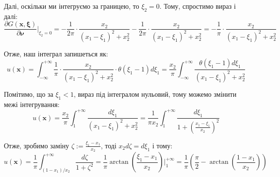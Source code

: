 \documentclass{hw_template}
\begin{document}
Далі, оскільки ми інтегруємо за границею, то $\xi_2 = 0$. Тому, спростимо вираз і далі:
\begin{equation*}
    \frac{\partial G(\mathbf{x}, \boldsymbol{\xi})}{\partial \boldsymbol{\nu}}\Big|_{\xi_2=0} = -\frac{1}{2\pi} \cdot \frac{x_2}{(x_1-\xi_1)^2+x_2^2} - \frac{1}{2\pi} \cdot \frac{x_2}{(x_1-\xi_1)^2+x_2^2} = -\frac{1}{\pi} \cdot \frac{x_2}{(x_1-\xi_1)^2+x_2^2}
\end{equation*}

Отже, наш інтеграл запишеться як:
\begin{equation*}
    u(\mathbf{x}) = \int_{-\infty}^{+\infty} \frac{1}{\pi} \cdot \frac{x_2}{(x_1-\xi_1)^2+x_2^2} \cdot \theta(\xi_1-1)d\xi_1 = \frac{x_2}{\pi}\int_{-\infty}^{+\infty} \frac{\theta(\xi_1-1)d\xi_1}{(x_1-\xi_1)^2+x_2^2}
\end{equation*}

Помітимо, що за $\xi_1 < 1$, вираз під інтегралом нульовий, тому можемо змінити межі інтегрування:
\begin{equation*}
    u(\mathbf{x}) = \frac{x_2}{\pi}\int_{1}^{+\infty} \frac{d\xi_1}{(x_1-\xi_1)^2+x_2^2} = \frac{1}{\pi x_2}\int_1^{+\infty} \frac{d\xi_1}{1+\left(\frac{x_1-\xi_1}{x_2}\right)^2}
\end{equation*}

Отже, зробимо заміну $\zeta := \frac{\xi_1-x_1}{x_2}$, тоді $x_2d\zeta = d\xi_1$ і тому:
\begin{equation*}
    u(\mathbf{x}) = \frac{1}{\pi}\int_{(1-x_1)/x_2}^{+\infty} \frac{d\zeta}{1+\zeta^2} = \frac{1}{\pi}\arctan \left(\frac{\xi_1-x_1}{x_2}\right)\Big|_{1}^{+\infty} = \boxed{\frac{1}{\pi}\left(\frac{\pi}{2} - \arctan \left(\frac{1-x_1}{x_2}\right)\right)}
\end{equation*}
\end{document}
